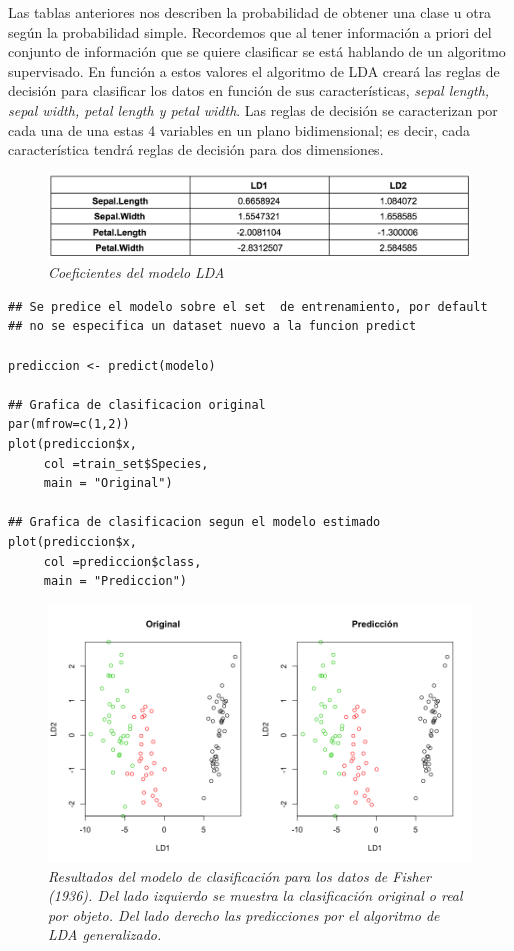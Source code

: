 \documentclass[letterpaper,12pt, spanish, oneside]{book} %
\begin{document}
Las tablas anteriores nos describen la probabilidad de obtener una clase u otra según la probabilidad simple. Recordemos que al tener información a priori del conjunto de información que se quiere clasificar se está hablando de un algoritmo supervisado. En función a estos valores el algoritmo de LDA creará las reglas de decisión para clasificar los datos en función de sus características, \textit{sepal length, sepal width, petal length y petal width}. Las reglas de decisión se caracterizan por cada una de una estas 4 variables en un plano bidimensional; es decir, cada característica tendrá reglas de decisión para dos dimensiones.

\begin{figure}[H]
\centering
\includegraphics[width=1\textwidth]{fase4.png}
\caption{\label{fig:frog2}\textit{Coeficientes del modelo LDA}}
\end{figure}

\begin{lstlisting}
## Se predice el modelo sobre el set  de entrenamiento, por default 
## no se especifica un dataset nuevo a la funcion predict

prediccion <- predict(modelo)

## Grafica de clasificacion original
par(mfrow=c(1,2))
plot(prediccion$x, 
     col =train_set$Species,
     main = "Original")

## Grafica de clasificacion segun el modelo estimado
plot(prediccion$x, 
     col =prediccion$class,
     main = "Prediccion")
\end{lstlisting}

\begin{figure}[H]
\centering
\includegraphics[width=1\textwidth]{fase5.png}
\caption{\label{fig:frog2}\textit{Resultados del modelo de clasificación para los datos de Fisher (1936). Del lado izquierdo se muestra la clasificación original o real por objeto. Del lado derecho las predicciones por el algoritmo de LDA generalizado.}}
\end{figure}
\end{document}
